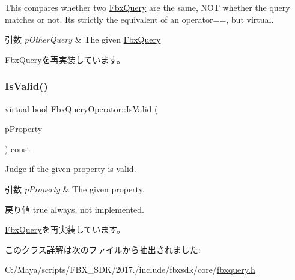 This compares whether two \hyperlink{class_fbx_query}{Fbx\+Query} are the same, N\+OT whether the query matches or not. It\textquotesingle{}s strictly the equivalent of an operator==, but virtual. 
\begin{DoxyParams}{引数}
{\em p\+Other\+Query} & The given \hyperlink{class_fbx_query}{Fbx\+Query} \\
\hline
\end{DoxyParams}


\hyperlink{class_fbx_query_adfc24c7306ceed2fcfd8c67198e0c1dd}{Fbx\+Query}を再実装しています。

\mbox{\label{class_fbx_query_operator_a14dd8a653d1e802f43b60c13d137ccce}} 
\subsubsection{\texorpdfstring{Is\+Valid()}{IsValid()}}
{\footnotesize\ttfamily virtual bool Fbx\+Query\+Operator\+::\+Is\+Valid (\begin{DoxyParamCaption}\item[{const \hyperlink{class_fbx_property}{Fbx\+Property} \&}]{p\+Property }\end{DoxyParamCaption}) const\hspace{0.3cm}{\ttfamily [virtual]}}

Judge if the given property is valid. 
\begin{DoxyParams}{引数}
{\em p\+Property} & The given property. \\
\hline
\end{DoxyParams}
\begin{DoxyReturn}{戻り値}
{\ttfamily true} always, not implemented. 
\end{DoxyReturn}


\hyperlink{class_fbx_query_a822776baf45a56d8e126e948ec25d920}{Fbx\+Query}を再実装しています。



このクラス詳解は次のファイルから抽出されました\+:\begin{DoxyCompactItemize}
\item 
C\+:/\+Maya/scripts/\+F\+B\+X\+\_\+\+S\+D\+K/2017./include/fbxsdk/core/\hyperlink{fbxquery_8h}{fbxquery.\+h}\end{DoxyCompactItemize}
